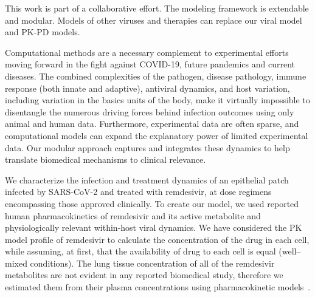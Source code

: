 This work is part of a collaborative effort. The modeling framework is extendable and modular. Models of other viruses and therapies can replace our viral model and PK-PD models.

Computational methods are a necessary complement to experimental efforts moving forward in the fight against COVID-19, future pandemics and current diseases. The combined complexities of the pathogen, disease pathology, immune response (both innate and adaptive), antiviral dynamics, and host variation, including variation in the basics units of the body,  make it virtually impossible to disentangle the numerous driving forces behind infection outcomes using only animal and human data. Furthermore, experimental data are often sparse, and computational models can expand the explanatory power of limited experimental data. Our modular approach captures and integrates these dynamics to help translate biomedical mechanisms to clinical relevance. 

We characterize the infection and treatment dynamics of an epithelial patch infected by SARS-CoV-2 and treated with remdesivir, at dose regimens encompassing those approved clinically. To create our model, we used reported human pharmacokinetics of remdesivir and its active metabolite and physiologically relevant within-host viral dynamics. We have considered the PK model profile of remdesivir to calculate the concentration of the drug in each cell, while assuming, at first, that the availability of drug to each cell is equal (well--mixed conditions).  The lung tissue concentration of all of the remdesivir metabolites are not evident in any reported biomedical study, therefore we estimated them from their plasma concentrations using pharmacokinetic models~\cite{humeniuk_safety_2020,hu2021pharmacokinetics, european_medicines_agency_summary_2020}.%



